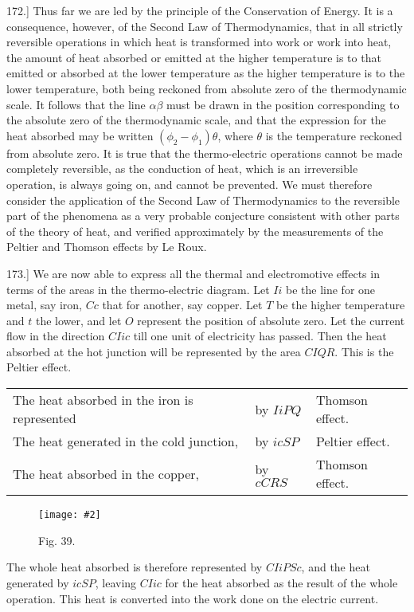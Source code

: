 \documentclass[12pt,oneside]{book}[2021/10/04]
\newcommand{\Runhead}[1]{\fancyhead[C]{\iffloatpage{}{\small#1}}}
\newcommand{\article}[1]{\phantomsection \label{art:#1}{#1.]}}
\newcommand{\widefig}[3]{
\begin{figure}[ht!]
\centering
\texttt{[image: \#2]}
\caption*{\small #3}
\end{figure}}
\newcommand{\¬}{\hphantom{0}}
\begin{document}
\article{172} Thus far we are led by the principle of the Conservation
of Energy. It is a consequence, however, of the Second Law of
Thermodynamics, that in all strictly reversible operations in which
heat is transformed into work or work into heat, the amount of heat
absorbed or emitted at the higher temperature is to that emitted or
absorbed at the lower temperature as the higher temperature is to
the lower temperature, both being reckoned from absolute zero of
the thermodynamic scale. It follows that the line \(\alpha \beta\) must be
drawn in the position corresponding to the absolute zero of the
thermodynamic scale, and that the expression for the heat absorbed
may be written \((\phi_2 - \phi_1) \theta\), where \(\theta\) is the temperature reckoned
from absolute zero. It is true that the thermo-electric operations
cannot be made completely reversible, as the conduction of heat,
which is an irreversible operation, is always going on, and cannot
be prevented. We must therefore consider the application of the
Second Law of Thermodynamics to the reversible part of the
phenomena as a very probable conjecture consistent with other
parts of the theory of heat, and verified approximately by the
measurements of the Peltier and Thomson effects by Le Roux.
\Runhead{SECOND LAW OF THERMODYNAMICS.}

\article{173} We are now able to express all the thermal and electromotive
effects in terms of the areas in the thermo-electric diagram.
Let \(Ii\) be the line for one metal, say iron, \(Cc\) that for another, say
copper. Let \(T\) be the higher temperature and \(t\) the lower, and let
\(O\) represent the position of absolute zero. Let the current flow in
the direction \(CIic\) till one unit of electricity has passed. Then the
heat absorbed at the hot junction will be represented by the area
\(CIQR\). This is the Peltier effect.

\begin{center}
\begin{tabular}{@{}l@{ }l@{\ldots}l}
The heat absorbed in the iron is represented & by \(IiPQ\) & {Thomson effect.}\\[.5ex]
The heat generated in the cold junction, & by \(icSP\) & Peltier effect.\\[.5ex]
The heat absorbed in the copper, & by \(cCRS\) & Thomson effect.
\end{tabular}
\end{center}

\widefig{0.72}{155.png}{Fig. 39.}
The whole heat absorbed is therefore represented by \(CIiPSc\), and
the heat generated by \(icSP\), leaving \(CIic\) for the heat absorbed as
the result of the whole operation. This heat is converted into the
work done on the electric current.
\end{document}
